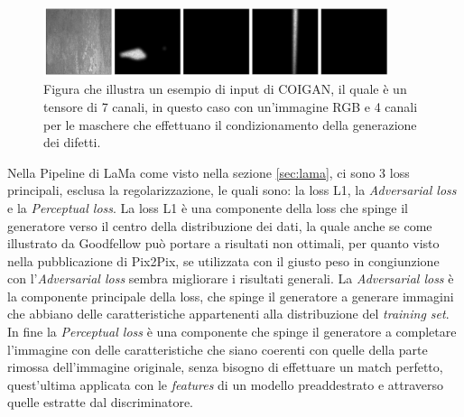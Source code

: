     \begin{figure}[H]
        \centering
        \includegraphics[width=0.9\textwidth]{imgs/Coigan/G_input.png}
        \caption{Figura che illustra un esempio di input di COIGAN, il quale è un tensore di 7 canali, in questo caso con un'immagine RGB e 4 canali
        per le maschere che effettuano il condizionamento della generazione dei difetti.} 
        \label{fig:Coigan input}
    \end{figure}

Nella Pipeline di LaMa come visto nella sezione \ref{sec:lama}, ci sono 3 loss principali, esclusa la regolarizzazione, le quali sono:
la loss L1, la \textit{Adversarial loss} e la \textit{Perceptual loss}. La loss L1 è una componente della loss che spinge il generatore verso
il centro della distribuzione dei dati, la quale anche se come illustrato da Goodfellow può portare a risultati non ottimali, per quanto visto
nella pubblicazione di Pix2Pix, se utilizzata con il giusto peso in congiunzione con l'\textit{Adversarial loss} sembra migliorare i risultati generali.
La \textit{Adversarial loss} è la componente principale della loss, che spinge il generatore a generare immagini che abbiano delle caratteristiche
appartenenti alla distribuzione del \textit{training set}. In fine la \textit{Perceptual loss} è una componente che spinge
il generatore a completare l'immagine con delle caratteristiche che siano coerenti con quelle della parte rimossa dell'immagine originale, senza bisogno di effettuare
un match perfetto, quest'ultima applicata con le \textit{features} di un modello preaddestrato e attraverso quelle estratte dal discriminatore.

